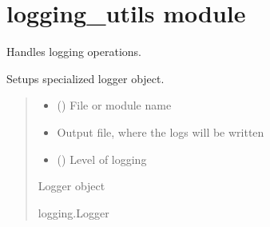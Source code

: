 \documentclass[letterpaper,10pt,english]{sphinxmanual}
\begin{document}
\sphinxstepscope


\section{logging\_utils module}
\label{\detokenize{logging_utils:module-logging_utils}}\label{\detokenize{logging_utils:logging-utils-module}}\label{\detokenize{logging_utils::doc}}
\sphinxAtStartPar
Handles logging operations.

\begin{fulllineitems}
\label{\detokenize{logging_utils:logging_utils.setup_logger}}
\pysigstartsignatures
\pysiglinewithargsret
{}
{\sphinxparamcomma {}\sphinxparamcomma {}}
{}
\pysigstopsignatures
\sphinxAtStartPar
Setups specialized logger object.
\begin{quote}\begin{description}
\begin{itemize}
\item {} 
\sphinxAtStartPar
{} () \textendash{} File or module name

\item {} 
\sphinxAtStartPar
{} \textendash{} Output file, where the logs will be written

\item {} 
\sphinxAtStartPar
{} () \textendash{} Level of logging

\end{itemize}

\sphinxAtStartPar
Logger object

\sphinxAtStartPar
logging.Logger

\end{description}\end{quote}

\end{fulllineitems}
\end{document}
